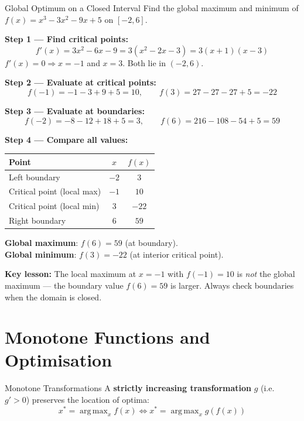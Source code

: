 \documentclass[12pt, a4paper]{article}
\theoremstyle{definition}
\DeclareMathOperator{\argmax}{arg\,max}
\begin{document}
\begin{exbox}{Global Optimum on a Closed Interval}
Find the global maximum and minimum of $f(x) = x^3 - 3x^2 - 9x + 5$
on $[-2, 6]$.

\textbf{Step 1 --- Find critical points:}
\[
  f'(x) = 3x^2 - 6x - 9 = 3(x^2-2x-3) = 3(x+1)(x-3)
\]
$f'(x) = 0 \Rightarrow x=-1$ and $x=3$. Both lie in $(-2,6)$.

\textbf{Step 2 --- Evaluate at critical points:}
\[
  f(-1) = -1-3+9+5 = 10, \qquad f(3) = 27-27-27+5 = -22
\]

\textbf{Step 3 --- Evaluate at boundaries:}
\[
  f(-2) = -8-12+18+5 = 3, \qquad f(6) = 216-108-54+5 = 59
\]

\textbf{Step 4 --- Compare all values:}

\begin{center}
\begin{tabular}{lcc}
  \toprule
  \rowcolor{tabhead}\color{white}Point & \color{white}$x$ & \color{white}$f(x)$ \\
  \midrule
  Left boundary & $-2$ & $3$ \\
  \rowcolor{tabeven}
  Critical point (local max) & $-1$ & $10$ \\
  Critical point (local min) & $3$ & $-22$ \\
  \rowcolor{tabeven}
  Right boundary & $6$ & $59$ \\
  \bottomrule
\end{tabular}
\end{center}

\textbf{Global maximum}: $f(6)=59$ (at boundary). \\
\textbf{Global minimum}: $f(3)=-22$ (at interior critical point).

\textbf{Key lesson:} The local maximum at $x=-1$ with $f(-1)=10$ is
\emph{not} the global maximum --- the boundary value $f(6)=59$ is larger.
Always check boundaries when the domain is closed.
\end{exbox}

\section{Monotone Functions and Optimisation}

\begin{defbox}{Monotone Transformations}
A \textbf{strictly increasing transformation} $g$ (i.e.\ $g' > 0$)
preserves the location of optima:
\[
  x^* = \argmax_{x} f(x) \iff x^* = \argmax_{x} g(f(x))
\]
\end{defbox}
\end{document}
